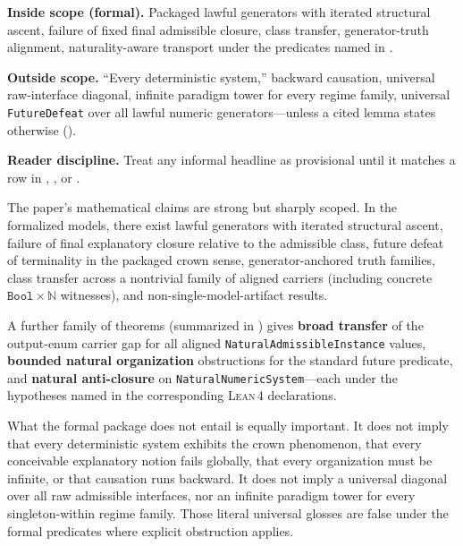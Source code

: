 \documentclass[11pt,a4paper]{article}
\newenvironment{keybox}[1]{%
  \Needspace*{8\baselineskip}%
  \begin{tcolorbox}[
    enhanced, breakable=false,
    colback=blue!5, colframe=blue!45!black, coltitle=black,
    colbacktitle=blue!14, boxrule=0.85pt, arc=2.5pt,
    left=9pt, right=9pt, top=6pt, bottom=6pt,
    titlerule=0.55pt, fonttitle=\bfseries, title={#1},
    before upper=\raggedright,
    before skip=0.9\baselineskip, after skip=0.9\baselineskip
  ]%
}{%
  \end{tcolorbox}%
}
\theoremstyle{definition}
\newcommand{\lean}{\textsc{Lean}\,4}
\begin{document}
\begin{keybox}{Trust boundary (scope at a glance)}
\textbf{Inside scope (formal).} Packaged lawful generators with iterated structural ascent, failure of fixed final admissible closure, class transfer, generator-truth alignment, naturality-aware transport under the predicates named in .

\medskip
\textbf{Outside scope.} ``Every deterministic system,'' backward causation, universal raw-interface diagonal, infinite paradigm tower for every regime family, universal \texttt{FutureDefeat} over all lawful numeric generators---unless a cited lemma states otherwise ().

\medskip
\textbf{Reader discipline.} Treat any informal headline as provisional until it matches a row in , , or .
\end{keybox}

The paper's mathematical claims are strong but sharply scoped. In the formalized models, there exist lawful generators with iterated structural ascent, failure of final explanatory closure relative to the admissible class, future defeat of terminality in the packaged crown sense, generator-anchored truth families, class transfer across a nontrivial family of aligned carriers (including concrete $\texttt{Bool}{\times}\mathbb{N}$ witnesses), and non-single-model-artifact results.

A further family of theorems (summarized in ) gives \textbf{broad transfer} of the output-enum carrier gap for all aligned \texttt{NaturalAdmissibleInstance} values, \textbf{bounded natural organization} obstructions for the standard future predicate, and \textbf{natural anti-closure} on \texttt{NaturalNumericSystem}---each under the hypotheses named in the corresponding \lean{} declarations.

What the formal package does not entail is equally important. It does not imply that every deterministic system exhibits the crown phenomenon, that every conceivable explanatory notion fails globally, that every organization must be infinite, or that causation runs backward. It does not imply a universal diagonal over all raw admissible interfaces, nor an infinite paradigm tower for every singleton-within regime family. Those literal universal glosses are false under the formal predicates where explicit obstruction applies.
\end{document}
